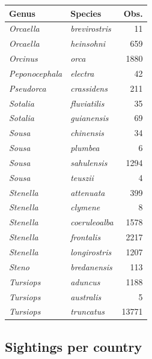 \documentclass[10pt,letterpaper]{article}
\begin{document}
\begin{table}
\begin{tabular}{r}
\hline
\end{tabular}
\centering
\begin{tabular}{l|l|r}
\hline
Genus & Species & Obs.\\
\hline
\em{Orcaella} & \em{brevirostris} & 11\\
\hline
\em{Orcaella} & \em{heinsohni} & 659\\
\hline
\em{Orcinus} & \em{orca} & 1880\\
\hline
\em{Peponocephala} & \em{electra} & 42\\
\hline
\em{Pseudorca} & \em{crassidens} & 211\\
\hline
\em{Sotalia} & \em{fluviatilis} & 35\\
\hline
\em{Sotalia} & \em{guianensis} & 69\\
\hline
\em{Sousa} & \em{chinensis} & 34\\
\hline
\em{Sousa} & \em{plumbea} & 6\\
\hline
\em{Sousa} & \em{sahulensis} & 1294\\
\hline
\em{Sousa} & \em{teuszii} & 4\\
\hline
\em{Stenella} & \em{attenuata} & 399\\
\hline
\em{Stenella} & \em{clymene} & 8\\
\hline
\em{Stenella} & \em{coeruleoalba} & 1578\\
\hline
\em{Stenella} & \em{frontalis} & 2217\\
\hline
\em{Stenella} & \em{longirostris} & 1207\\
\hline
\em{Steno} & \em{bredanensis} & 113\\
\hline
\em{Tursiops} & \em{aduncus} & 1188\\
\hline
\em{Tursiops} & \em{australis} & 5\\
\hline
\em{Tursiops} & \em{truncatus} & 13771\\
\hline
\end{tabular}
\end{table}

\hypertarget{sightings-per-country}{%
\subsection{Sightings per country}\label{sightings-per-country}}
\end{document}
